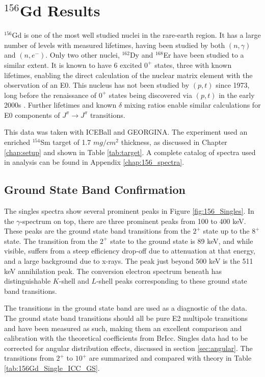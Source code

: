 \chapter{$^{156}$Gd Results}
\label{chap:156Gd}
\normalsize

$^{156}$Gd is one of the most well studied nuclei in the rare-earth region. It has a large number of levels with measured lifetimes, having been studied by both $(n,\gamma)$ and $(n,e^-)$\citep{klora93:_156gd}. Only two other nuclei, $^{162}$Dy and $^{168}$Er have been studied to a similar extent. It is known to have 6 excited $0^+$ states, three with known lifetimes, enabling the direct calculation of the nuclear matrix element with the observation of an E0. This nucleus has not been studied by $(p,t)$ since 1973, long before the renaissance of $0^+$ states being discovered via $(p,t)$ in the early 2000s \citep{fleming73:_156gd,lesher02:_158gd,meyer06:_zeroplus}. Further lifetimes and known $\delta$ mixing ratios enable similar calculations for E0 components of $J^{\pi}\rightarrow J^{\pi}$ transitions. 

This data was taken with ICEBall and GEORGINA. The experiment used an enriched $^{154}$Sm target of 1.7 $mg/cm^2$ thickness, as discussed in Chapter \ref{chap:setup} and shown in Table \ref{tab:target}. A complete catalog of spectra used in analysis can be found in Appendix \ref{chap:156_spectra}.

\section{Ground State Band Confirmation}

The singles spectra show several prominent peaks in Figure \ref{fig:156_Singles}. In the $\gamma$-spectrum on top, there are three prominent peaks from 100 to 400 keV. These peaks are the ground state band transitions from the $2^+$ state up to the $8^+$ state. The transition from the $2^+$ state to the ground state is 89 keV, and while visible, suffers from a steep efficiency drop-off due to attenuation at that energy, and a large background due to x-rays. The peak just beyond 500 keV is the 511 keV annihilation peak. The conversion electron spectrum beneath has distinguishable $K$-shell and $L$-shell peaks corresponding to these ground state band transitions. 

\afterpage{}

The transitions in the ground state band are used as a diagnostic of the data. The ground state band transitions should all be pure E2 multipole transitions and have been measured as such, making them an excellent comparison and calibration with the theoretical coefficients from BrIcc\citep{kibedi08:_BRICC}. Singles data had to be corrected for angular distribution effects, discussed in section \ref{sec:angular}. The transitions from $2^+$ to $10^+$ are summarized and compared with theory in Table \ref{tab:156Gd_Single_ICC_GS}.

